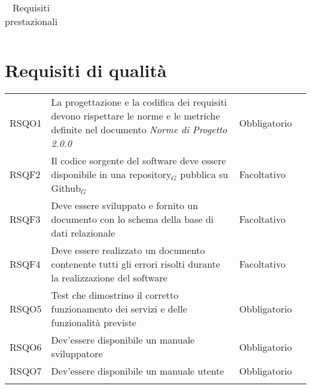 {{\begin{center}
\begin{longtable}{|p{4cm}|p{4cm}|p{4cm}|p{3cm}|}
		\caption[Requisiti prestazionali]{Requisiti prestazionali}\label{4.2}\\
			\end{longtable}
	\end{center}
\newpage
\section{Requisiti di qualità}\label{RequisitiDiQualita}
\def\tabularxcolumn#1{m{#1}}
{

	\begin{center}
		\renewcommand{\arraystretch}{1.4}
		\begin{longtable}{|p{4cm}|p{4cm}|p{4cm}|p{3cm}|}
			\hline
			\rowcolor{airforceblue}
			\makecell[c]{\textbf{Codice RS}} & \makecell[c]{\textbf{Descrizione}} & \makecell[c]{\textbf{Tipo di requisito}} & \makecell[c]{\textbf{Fonte}} \\
			\hline
		\centering RSQO1  & La progettazione e la codifica dei requisiti devono rispettare le norme e le metriche definite nel documento \textit{Norme di Progetto 2.0.0}&\centering  Obbligatorio & \makecell[tc]{Interno} \\
		\hline
		\centering RSQF2  & Il codice sorgente del software deve essere disponibile in una repository$_G$ pubblica su Github$_G$  &\centering  Facoltativo & \makecell[tc]{Interno} \\
		\hline
		\centering RSQF3  & Deve essere sviluppato e fornito un documento con lo schema della base di dati relazionale  & \centering Facoltativo & \makecell[tc]{Interno } \\
		\hline
		\centering RSQF4  & Deve essere realizzato un documento contenente tutti gli errori risolti durante la realizzazione del software &\centering  Facoltativo & \makecell[tc]{Interno} \\
		\hline
		\centering RSQO5  & Test che dimostrino il corretto funzionamento dei servizi e delle funzionalità previste  & \centering Obbligatorio & \makecell[tc]{Capitolato$_{\scaleto{G}{3pt}}$} \\
		\hline
		\centering RSQO6  & Dev'essere disponibile un manuale sviluppatore  & \centering Obbligatorio & \makecell[tc]{Capitolato$_{\scaleto{G}{3pt}}$} \\
		\hline
		\centering RSQO7  & Dev'essere disponibile un manuale utente  & \centering Obbligatorio & \makecell[tc]{Capitolato$_{\scaleto{G}{3pt}}$} \\
		\hline
		\rowcolor{white}


\end{longtable}
\end{center}}}}
